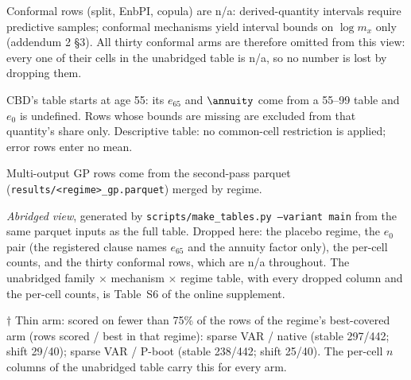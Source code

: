\begin{table}[tbp]
\begin{threeparttable}
\begin{tablenotes}
\item Conformal rows (split, EnbPI, copula) are n/a: derived-quantity intervals require predictive samples; conformal mechanisms yield interval bounds on $\log m_x$ only (addendum 2 \S3). All thirty conformal arms are therefore omitted from this view: every one of their cells in the unabridged table is n/a, so no number is lost by dropping them.
\item CBD's table starts at age 55: its $e_{65}$ and $\annuity$ come from a 55--99 table and $e_0$ is undefined. Rows whose bounds are missing are excluded from that quantity's share only. Descriptive table: no common-cell restriction is applied; error rows enter no mean.
\item Multi-output GP rows come from the second-pass parquet (\texttt{results/<regime>\_gp.parquet}) merged by regime.
\item \emph{Abridged view}, generated by \texttt{scripts/make\_tables.py --variant main} from the same parquet inputs as the full table. Dropped here: the placebo regime, the $e_0$ pair (the registered clause names $e_{65}$ and the annuity factor only), the per-cell counts, and the thirty conformal rows, which are n/a throughout. The unabridged family $\times$ mechanism $\times$ regime table, with every dropped column and the per-cell counts, is Table~S6 of the online supplement.
\item $\dagger$ Thin arm: scored on fewer than 75\% of the rows of the regime's best-covered arm (rows scored / best in that regime): sparse VAR / native (stable 297/442; shift 29/40); sparse VAR / P-boot (stable 238/442; shift 25/40). The per-cell $n$ columns of the unabridged table carry this for every arm.
\end{tablenotes}
\end{threeparttable}
\end{table}
